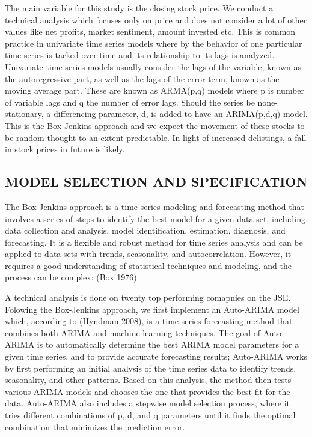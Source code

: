 \documentclass[
]{article}
\begin{document}
The main variable for this study is the closing stock price. We conduct
a technical analysis which focuses only on price and does not consider a
lot of other values like net profits, market sentiment, amount invested
etc. This is common practice in univariate time series models where by
the behavior of one particular time series is tacked over time and its
relationship to its lags is analyzed. Univariate time series models
usually consider the lags of the variable, known as the autoregressive
part, as well as the lags of the error term, known as the moving average
part. These are known as ARMA(p,q) models where p is number of variable
lags and q the number of error lags. Should the series be
none-stationary, a differencing parameter, d, is added to have an
ARIMA(p,d,q) model. This is the Box-Jenkins approach and we expect the
movement of these stocks to be random thought to an extent predictable.
In light of increased delistings, a fall in stock prices in future is
likely.

\hypertarget{model-selection-and-specification}{%
\subsection{MODEL SELECTION AND
SPECIFICATION}\label{model-selection-and-specification}}

The Box-Jenkins approach is a time series modeling and forecasting
method that involves a series of steps to identify the best model for a
given data set, including data collection and analysis, model
identification, estimation, diagnosis, and forecasting. It is a flexible
and robust method for time series analysis and can be applied to data
sets with trends, seasonality, and autocorrelation. However, it requires
a good understanding of statistical techniques and modeling, and the
process can be complex: (Box 1976)

A technical analysis is done on twenty top performing comapnies on the
JSE. Folowing the Box-Jenkins approach, we first implement an Auto-ARIMA
model which, according to (Hyndman 2008), is a time series forecasting
method that combines both ARIMA and machine learning techniques. The
goal of Auto-ARIMA is to automatically determine the best ARIMA model
parameters for a given time series, and to provide accurate forecasting
results; Auto-ARIMA works by first performing an initial analysis of the
time series data to identify trends, seasonality, and other patterns.
Based on this analysis, the method then tests various ARIMA models and
chooses the one that provides the best fit for the data. Auto-ARIMA also
includes a stepwise model selection process, where it tries different
combinations of p, d, and q parameters until it finds the optimal
combination that minimizes the prediction error.
\end{document}
